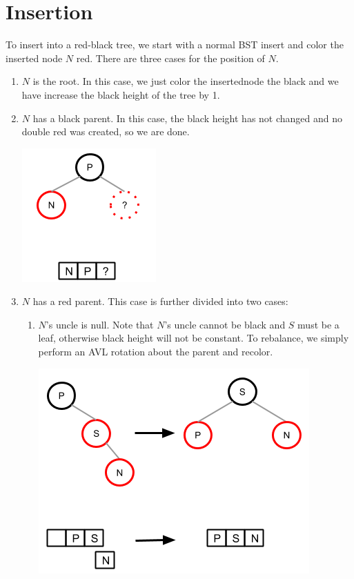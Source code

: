 \documentclass[12pt]{article}
\begin{document}
\section*{Insertion}
To insert into a red-black tree, we start with a normal BST insert and color the inserted node $N$ red. There are three cases for the position of $N$.
\begin{enumerate}
  \item $N$ is the root. In this case, we just color the insertednode the black and we have increase the black height of the tree by 1.
  \item $N$ has a black parent. In this case, the black height has not changed and no double red was created, so we are done.
  \begin{center}
    \includegraphics[scale=0.75]{pics/red_black_tree/ins_bpar}
  \end{center}
  \item $N$ has a red parent. This case is further divided into two cases:
  \begin{enumerate}
    \item $N$'s uncle is null. Note that $N$'s uncle cannot be black and $S$ must be a leaf, otherwise black height will not be constant. To rebalance, we simply perform an AVL rotation about the parent and recolor.
    \begin{center}
      \includegraphics[scale=0.75]{pics/red_black_tree/ins_rpar_bunc_rr}

\end{center}
\end{enumerate}
\end{enumerate}
\end{document}
